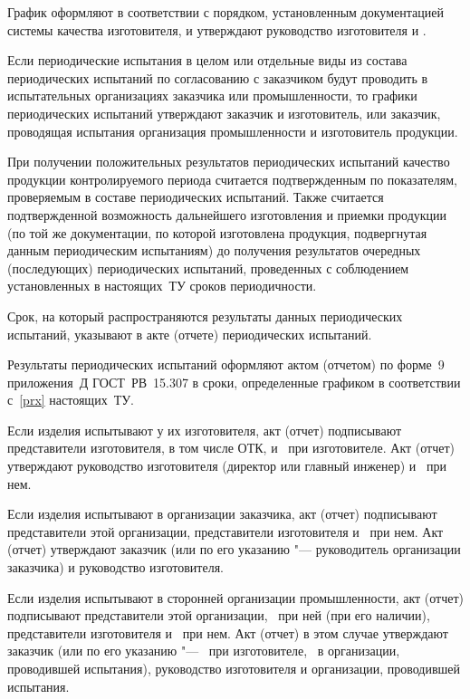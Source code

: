 График оформляют в соответствии с порядком, установленным документацией системы качества изготовителя, и утверждают руководство изготовителя и \client.

\point  
Если периодические испытания в целом или отдельные виды из состава периодических испытаний по согласованию с заказчиком будут проводить в испытательных организациях заказчика или промышленности, то графики периодических испытаний утверждают заказчик и изготовитель, или заказчик, проводящая испытания организация промышленности и изготовитель продукции.

\point
При получении положительных результатов периодических испытаний качество продукции контролируемого периода считается подтвержденным по показателям, проверяемым в составе периодических испытаний. Также считается подтвержденной возможность дальнейшего изготовления и приемки продукции (по той же документации, по которой изготовлена продукция, подвергнутая данным периодическим испытаниям) до получения результатов очередных (последующих) периодических испытаний, проведенных с соблюдением установленных в настоящих~ТУ сроков периодичности.

Срок, на который распространяются результаты данных периодических испытаний, указывают в акте (отчете) периодических испытаний.

\point
\label{prx2}  
Результаты периодических испытаний оформляют актом (отчетом) по форме~9 приложения~Д ГОСТ~РВ~15.307 в сроки, определенные графиком в соответствии с~\ref{prx} настоящих~ТУ.

Если изделия испытывают у их изготовителя, акт (отчет) подписывают представители изготовителя, в том числе ОТК, и \client \ при изготовителе. Акт (отчет) утверждают руководство изготовителя (директор или главный инженер) и \client \ при нем.

Если изделия испытывают в организации заказчика, акт (отчет) подписывают представители этой организации, представители изготовителя и \client \ при нем. Акт (отчет) утверждают заказчик (или по его указанию "--- руководитель организации заказчика) и руководство изготовителя.

Если изделия испытывают в сторонней организации промышленности, акт (отчет) подписывают представители этой организации, \client \ при ней (при его наличии), представители изготовителя и \client \ при нем. Акт (отчет) в этом случае утверждают заказчик (или по его указанию "--- \client \ при изготовителе, \client \ в организации, проводившей испытания), руководство изготовителя и организации, проводившей испытания.

